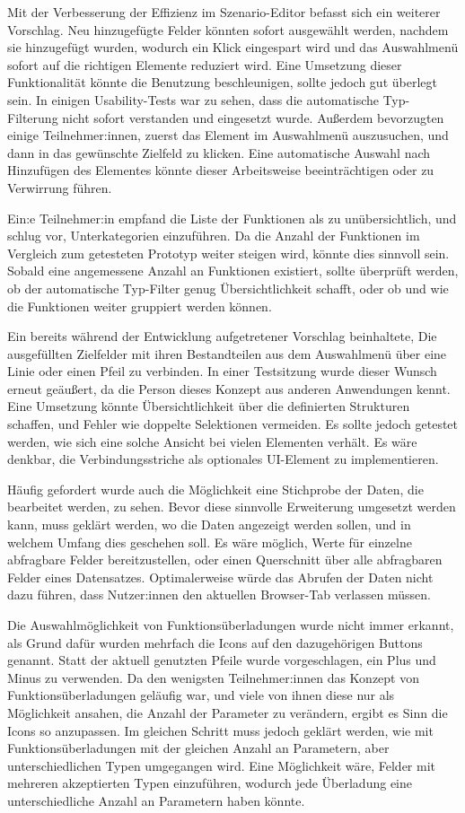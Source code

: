 Mit der Verbesserung der Effizienz im Szenario-Editor befasst sich ein weiterer Vorschlag. Neu hinzugefügte Felder könnten sofort ausgewählt werden, nachdem sie hinzugefügt wurden, wodurch ein Klick eingespart wird und das Auswahlmenü sofort auf die richtigen Elemente reduziert wird. Eine Umsetzung dieser Funktionalität könnte die Benutzung beschleunigen, sollte jedoch gut überlegt sein. In einigen Usability-Tests war zu sehen, dass die automatische Typ-Filterung nicht sofort verstanden und eingesetzt wurde. Außerdem bevorzugten einige Teilnehmer:innen, zuerst das Element im Auswahlmenü auszusuchen, und dann in das gewünschte Zielfeld zu klicken. Eine automatische Auswahl nach Hinzufügen des Elementes könnte dieser Arbeitsweise beeinträchtigen oder zu Verwirrung führen.

Ein:e Teilnehmer:in empfand die Liste der Funktionen als zu unübersichtlich, und schlug vor, Unterkategorien einzuführen. Da die Anzahl der Funktionen im Vergleich zum getesteten Prototyp weiter steigen wird, könnte dies sinnvoll sein. Sobald eine angemessene Anzahl an Funktionen existiert, sollte überprüft werden, ob der automatische Typ-Filter genug Übersichtlichkeit schafft, oder ob und wie die Funktionen weiter gruppiert werden können.

Ein bereits während der Entwicklung aufgetretener Vorschlag beinhaltete, Die ausgefüllten Zielfelder mit ihren Bestandteilen aus dem Auswahlmenü über eine Linie oder einen Pfeil zu verbinden. In einer Testsitzung wurde dieser Wunsch erneut geäußert, da die Person dieses Konzept aus anderen Anwendungen kennt. Eine Umsetzung könnte Übersichtlichkeit über die definierten Strukturen schaffen, und Fehler wie doppelte Selektionen vermeiden. Es sollte jedoch getestet werden, wie sich eine solche Ansicht bei vielen Elementen verhält. Es wäre denkbar, die Verbindungsstriche als optionales UI-Element zu implementieren.

Häufig gefordert wurde auch die Möglichkeit eine Stichprobe der Daten, die bearbeitet werden, zu sehen. Bevor diese sinnvolle Erweiterung umgesetzt werden kann, muss geklärt werden, wo die Daten angezeigt werden sollen, und in welchem Umfang dies geschehen soll. Es wäre möglich, Werte für einzelne abfragbare Felder bereitzustellen, oder einen Querschnitt über alle abfragbaren Felder eines Datensatzes. Optimalerweise würde das Abrufen der Daten nicht dazu führen, dass Nutzer:innen den aktuellen Browser-Tab verlassen müssen.

Die Auswahlmöglichkeit von Funktionsüberladungen wurde nicht immer erkannt, als Grund dafür wurden mehrfach die Icons auf den dazugehörigen Buttons genannt. Statt der aktuell genutzten Pfeile wurde vorgeschlagen, ein Plus und Minus zu verwenden. Da den wenigsten Teilnehmer:innen das Konzept von Funktionsüberladungen geläufig war, und viele von ihnen diese nur als Möglichkeit ansahen, die Anzahl der Parameter zu verändern, ergibt es Sinn die Icons so anzupassen. Im gleichen Schritt muss jedoch geklärt werden, wie mit Funktionsüberladungen mit der gleichen Anzahl an Parametern, aber unterschiedlichen Typen umgegangen wird. Eine Möglichkeit wäre, Felder mit mehreren akzeptierten Typen einzuführen, wodurch jede Überladung eine unterschiedliche Anzahl an Parametern haben könnte.

